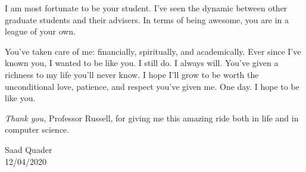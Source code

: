   I am most fortunate to be your student. 
  I've seen the dynamic between other graduate students and their advisers. 
  In terms of being awesome, you are in a league of your own.

  You've taken care of me: financially, spiritually, and academically. 
  Ever since I've known you, I wanted to be like you. I still do. I always will. 
  You've given a richness to my life you'll never know.
  I hope I'll grow to be worth the unconditional love, patience, and respect you've given me. One day. 
  I hope to be like you.

  \emph{Thank you,} Professor Russell, for giving me this amazing ride 
  both in life and in computer science.

 \vspace{1in}
 \begin{flushright}
  Saad Quader\\
  12/04/2020   
 \end{flushright}
